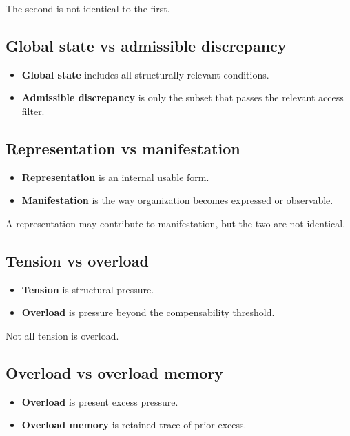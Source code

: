 \documentclass[11pt,a4paper]{article}
\begin{document}
	The second is not identical to the first.
	
	\subsection{Global state vs admissible discrepancy}
	
	\begin{itemize}[leftmargin=2em]
		\item \textbf{Global state} includes all structurally relevant conditions.
		\item \textbf{Admissible discrepancy} is only the subset that passes the relevant access filter.
	\end{itemize}
	
	\subsection{Representation vs manifestation}
	
	\begin{itemize}[leftmargin=2em]
		\item \textbf{Representation} is an internal usable form.
		\item \textbf{Manifestation} is the way organization becomes expressed or observable.
	\end{itemize}
	
	A representation may contribute to manifestation, but the two are not identical.
	
	\subsection{Tension vs overload}
	
	\begin{itemize}[leftmargin=2em]
		\item \textbf{Tension} is structural pressure.
		\item \textbf{Overload} is pressure beyond the compensability threshold.
	\end{itemize}
	
	Not all tension is overload.
	
	\subsection{Overload vs overload memory}
	
	\begin{itemize}[leftmargin=2em]
		\item \textbf{Overload} is present excess pressure.
		\item \textbf{Overload memory} is retained trace of prior excess.
	\end{itemize}
	
\end{document}
